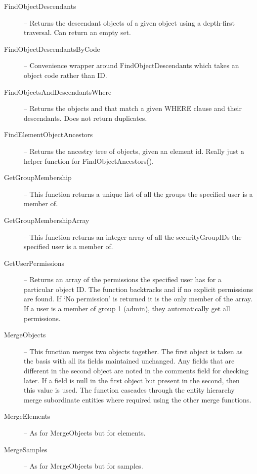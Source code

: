 \begin{description}
 \item[FindObjectDescendants] -- Returns the descendant objects of a given object using a depth-first traversal. Can return an empty set. 

 \item[FindObjectDescendantsByCode] -- Convenience wrapper around FindObjectDescendants which takes an object code rather than ID.

 \item[FindObjectsAndDescendantsWhere] -- Returns the objects and that match a given WHERE clause and their descendants. Does not return duplicates. 

 \item[FindElementObjectAncestors] -- Returns the ancestry tree of objects, given an element id. Really just a helper function for FindObjectAncestors(). 

 \item[GetGroupMembership] -- This function returns a unique list of all the groups the specified user is a member of. 

 \item[GetGroupMembershipArray] -- This function returns an integer array of all the securityGroupIDs the specified user is a member of. 

 \item[GetUserPermissions] -- Returns an array of the permissions the specified user has for a particular object ID. The function backtracks  and  if no explicit permissions are found. If `No permission' is returned it is the only member of the array. If a user is a member of group 1 (admin), they automatically get all permissions. 

 \item[MergeObjects] -- This function merges two objects together. The first object is taken as the basis with all its fields maintained unchanged. Any fields that are different in the second object are noted in the comments field for checking later. If a field is null in the first object but present in the second, then this value is used. The function cascades through the entity hierarchy merge subordinate entities where required using the other merge functions. 

 \item[MergeElements] -- As for MergeObjects but for elements.

 \item[MergeSamples] -- As for MergeObjects but for samples.


\end{description}
